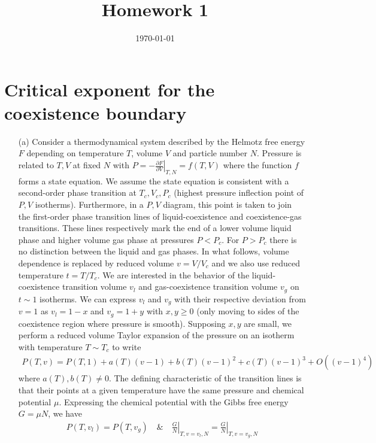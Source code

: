 \documentclass[10pt, a4paper]{article}
\title{Homework 1} %
\author{\PA} %
\date{\today} %
\begin{document}
\maketitlepage

\maketableofcontents


\footnotesize{
\section{Critical exponent for the coexistence boundary}
\begin{enumerate}
  \item[(a)] Consider a thermodynamical system described by the Helmotz free energy $F$ depending on temperature $T$, volume $V$ and particle number $N$. Pressure is related to $T, V$ at fixed $N$ with $P= -\left.\frac{\partial F}{\partial V}\right|_{T, N} = f(T, V)$ where the function $f$ forms a state equation. We assume the state equation is consistent with a second-order phase transition at $T_c, V_c, P_c$ (highest pressure inflection point of $P, V$ isotherms). Furthermore, in a $P, V$ diagram, this point is taken to join the first-order phase transition lines of liquid-coexistence and coexistence-gas transitions. These lines respectively mark the end of a lower volume liquid phase and higher volume gas phase at pressures $P<P_c$. For $P> P_c$ there is no distinction between the liquid and gas phases. In what follows, volume dependence is replaced by reduced volume $v = V/V_c$ and we also use reduced temperature $t=T/T_c$. We are interested in the behavior of the liquid-coexistence transition volume $v_l$ and gas-coexistence transition volume $v_g$ on $t \sim 1$ isotherms. We can express $v_l$ and $v_g$ with their respective deviation from $v = 1$ as $v_l = 1 - x$ and $v_g = 1 + y$ with $x , y \ge 0$ (only moving to sides of the coexistence region where pressure is smooth). Supposing $x, y$ are small, we perform a reduced volume Taylor expansion of the pressure on an isotherm with temperature $T \sim T_c$ to write 
  \begin{align*}
    P(T, v) =  P(T, 1) + a(T) (v-1) + b(T) (v-1)^2 + c(T) (v-1)^3 + O((v-1)^4)
  \end{align*}
  where $a(T), b(T) \neq 0$. The defining characteristic of the transition lines is that their points at a given temperature have the same pressure and chemical potential $\mu$. Expressing the chemical potential with the Gibbs free energy $G = \mu N$, we have 
  \begin{align*}
    P(T, v_l) = P(T, v_g) \quad \& \quad  \left.\frac{G}{N}\right|_{T, v=v_l, N} = \left.\frac{G}{N}\right|_{T, v=v_g, N}

\end{align*}
\end{enumerate}}
\end{document}
